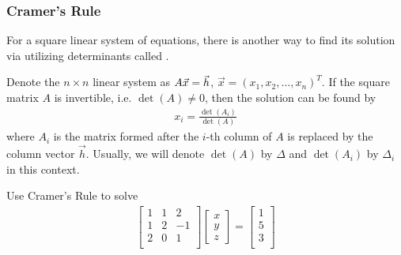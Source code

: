 \subsubsection{Cramer's Rule}
For a square linear system of equations, there is another way to find its solution via utilizing determinants called .
\begin{thm}
\label{thm:Cramer}
Denote the $n\times n$ linear system as $A\vec{x} = \smash{\vec{h}}$, $\vec{x} = (x_1, x_2, \ldots, x_n)^T$. If the square matrix $A$ is invertible, i.e. $\det(A) \neq 0$, then the solution can be found by
\begin{align}
x_i = \frac{\det(A_i)}{\det(A)}
\end{align}
where $A_i$ is the matrix formed after the $i$-th column of $A$ is replaced by the column vector $\vec{h}$. Usually, we will denote $\det(A)$ by $\Delta$ and $\det(A_i)$ by $\Delta_i$ in this context.
\end{thm}
\begin{exmp}
Use Cramer's Rule to solve
\begin{align*}
\begin{bmatrix}
1 & 1 & 2 \\
1 & 2 & -1 \\
2 & 0 & 1 \\
\end{bmatrix}
\begin{bmatrix}
x \\
y \\
z 
\end{bmatrix}
=
\begin{bmatrix}
1 \\
5 \\
3 \\
\end{bmatrix}   
\end{align*}
\end{exmp}
